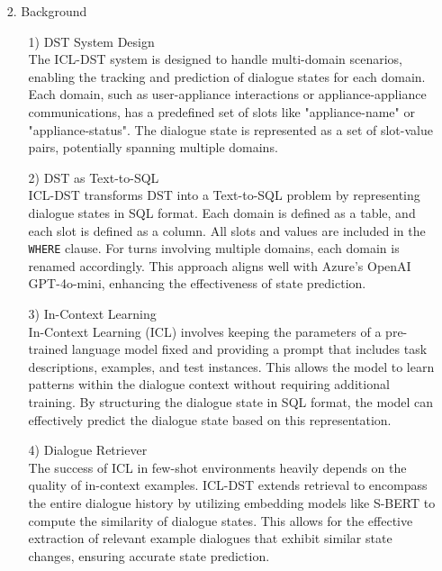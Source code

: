 \documentclass[conference]{IEEEtran}
\begin{document}
\begin{itemize}
    \item [2.] Background
    
    \begin{itemize}
    \item [1)] DST System Design \\
The ICL-DST system is designed to handle multi-domain scenarios, enabling the tracking and prediction of dialogue states for each domain. Each domain, such as user-appliance interactions or appliance-appliance communications, has a predefined set of slots like "appliance-name" or "appliance-status". The dialogue state is represented as a set of slot-value pairs, potentially spanning multiple domains. \\
\end{itemize}

\begin{itemize}
    \item [2)] DST as Text-to-SQL \\
ICL-DST transforms DST into a Text-to-SQL problem by representing dialogue states in SQL format. Each domain is defined as a table, and each slot is defined as a column. All slots and values are included in the \texttt{WHERE} clause. For turns involving multiple domains, each domain is renamed accordingly. This approach aligns well with Azure's OpenAI GPT-4o-mini, enhancing the effectiveness of state prediction. \\
\end{itemize}

\begin{itemize}
    \item [3)] In-Context Learning \\
In-Context Learning (ICL) involves keeping the parameters of a pre-trained language model fixed and providing a prompt that includes task descriptions, examples, and test instances. This allows the model to learn patterns within the dialogue context without requiring additional training. By structuring the dialogue state in SQL format, the model can effectively predict the dialogue state based on this representation. \\
\end{itemize}

\begin{itemize}
    \item [4)] Dialogue Retriever \\
The success of ICL in few-shot environments heavily depends on the quality of in-context examples. ICL-DST extends retrieval to encompass the entire dialogue history by utilizing embedding models like S-BERT to compute the similarity of dialogue states. This allows for the effective extraction of relevant example dialogues that exhibit similar state changes, ensuring accurate state prediction. \\
\end{itemize}

\end{itemize}
\end{document}
